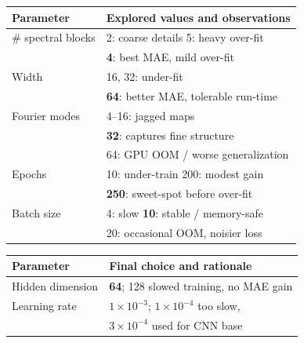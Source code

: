 \documentclass{article}
\begin{document}
\vspace{-4pt}
\begin{figure}
\centering
\small
\setlength{\tabcolsep}{3pt}
\renewcommand{\arraystretch}{1.05}

\begin{minipage}[t]{0.48\linewidth}
\label{tab:fno_ablate}
\begin{tabularx}{\linewidth}{@{}l X@{}}
\toprule
\textbf{Parameter} & \textbf{Explored values and observations}\\
\midrule
\# spectral blocks & 2: coarse details \hfill 5: heavy over-fit \\
                   & \textbf{4}: best MAE, mild over-fit \\[2pt]

Width & 16, 32: under-fit \\
      & \textbf{64}: better MAE, tolerable run-time \\[2pt]

Fourier modes & 4–16: jagged maps \\
              & \textbf{32}: captures fine structure \\
              & 64: GPU OOM / worse generalization \\[2pt]

Epochs & 10: under-train \hfill 200: modest gain \\
       & \textbf{250}: sweet-spot before over-fit \\[2pt]

Batch size & 4: slow \hfill \textbf{10}: stable / memory-safe \\
           & 20: occasional OOM, noisier loss \\
\bottomrule
\end{tabularx}
\end{minipage}\hfill
%
\begin{minipage}[t]{0.48\linewidth}
\label{tab:ode_ablate}
\begin{tabularx}{\linewidth}{@{}l X@{}}
\toprule
\textbf{Parameter} & \textbf{Final choice and rationale}\\
\midrule
Hidden dimension & \textbf{64}; 128 slowed training, no MAE gain \\[2pt]

Learning rate & \textbf{$1\!\times\!10^{-3}$}; $1\!\times\!10^{-4}$ too slow, \\
              & $3\!\times\!10^{-4}$ used for CNN base \\[2pt]


\end{tabularx}
\end{minipage}
\end{figure}
\end{document}

